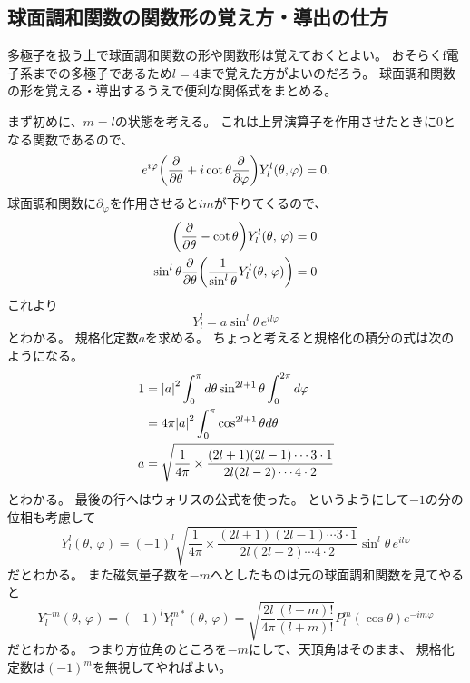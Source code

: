 \documentclass[../../master.tex]{subfiles}
\begin{document}
\subsection{球面調和関数の関数形の覚え方・導出の仕方}
多極子を扱う上で球面調和関数の形や関数形は覚えておくとよい。
おそらくf電子系までの多極子であるため\(l=4\)まで覚えた方がよいのだろう。
球面調和関数の形を覚える・導出するうえで便利な関係式をまとめる。

まず初めに、\(m=l\)の状態を考える。
これは上昇演算子を作用させたときに\(0\)となる関数であるので、
\begin{equation}
	e^{i\varphi}\qty(\pdv{\theta}+i\cot\theta\pdv{\varphi})Y_l^l(\theta,\varphi)=0.
\end{equation}
球面調和関数に\(\partial_\varphi\)を作用させると\(im\)が下りてくるので、
\begin{equation}\begin{aligned}[b]
    \qty(\pdv{\theta} - \cot\theta) Y_l^l(\theta,\,\varphi) = 0 \\
	\sin^l\theta\pdv{\theta}\qty(\frac{1}{\sin^l \theta}Y_l^l(\theta,\,\varphi))=0
\end{aligned}\end{equation}
これより
\begin{equation}
	Y_l^l =a \sin^l\theta\, e^{il\varphi}
\end{equation}
とわかる。
規格化定数\(a\)を求める。
ちょっと考えると規格化の積分の式は次のようになる。
\begin{equation}\begin{aligned}[b]
    1 & = \abs{a}^2 \int_{0}^{\pi} d\theta \sin^{2l+1}\theta \int_{0}^{2\pi} d\varphi              \\
	  & = 4\pi \abs{a}^2 \int_{0}^{\pi} \cos^{2l+1}\theta d\theta                                 \\
	a & = \sqrt{\frac{1}{4\pi}\times\frac{(2l+1)(2l-1)\cdots 3\cdot 1}{2l(2l-2) \cdots 4\cdot 2}}
\end{aligned}\end{equation}
とわかる。
最後の行へはウォリスの公式を使った。
というようにして\(-1\)の分の位相も考慮して
\begin{equation}
	Y_l^l(\theta,\,\varphi)
	= (-1)^l\sqrt{\frac{1}{4\pi}\times\frac{(2l+1)(2l-1)\cdots 3\cdot 1}{2l(2l-2) \cdots 4\cdot 2}}
	\sin^l \theta \, e^{il\varphi}
\end{equation}
だとわかる。
また磁気量子数を\(-m\)へとしたものは元の球面調和関数を見てやると
\begin{equation}
	Y_l^{-m}(\theta,\,\varphi) = (-1)^l Y_l^{m*}(\theta,\,\varphi)
	= \sqrt{\frac{2l}{4\pi}\frac{(l-m)!}{(l+m)!}}P_l^m(\cos\theta)e^{-im\varphi}
\end{equation}
だとわかる。
つまり方位角のところを\(-m\)にして、天頂角はそのまま、
規格化定数は\((-1)^m\)を無視してやればよい。
\end{document}
